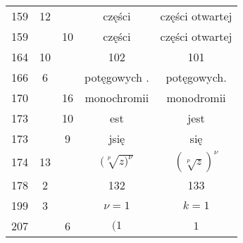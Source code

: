 \documentclass[a4paper,11pt]{article}
\begin{document}
\begin{center}
\begin{tabular}{|c|c|c|c|c|}
    159 & 12 & & części & części otwartej \\
    159 & & 10 & części & części otwartej \\
    164 & 10 & & 102 & 101 \\
    166 & \hphantom{0}6 & & potęgowych . & potęgowych. \\
    170 & & 16 & monochromii & monodromii \\
    173 & & 10 & est & jest \\
    173 & & \hphantom{0}9 & jsię & się \\
    174 & 13 & & $( \sqrt[p]{ z )^{ \nu } }$ & $( \sqrt[p]{ z } )^{ \nu }$ \\
    178 & \hphantom{0}2 & & 132 & 133 \\
    199 & \hphantom{0}3 & & $\nu = 1$ & $k = 1$ \\
    207 & & \hphantom{0}6 & $( 1$ & $1$ \\
    \hline
  \end{tabular}

\end{center}

\vspace{\spaceTwo}
\end{document}

